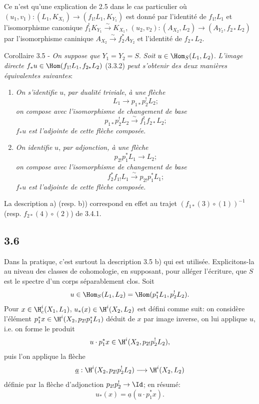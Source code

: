 Ce n'est qu'une explication de 2.5 dans le cas particulier où $(u_1,v_1):(L_1,K_{X_1})\to(f_{1!}L_1,K_{Y_1})$ est donné par l'identité de $f_{1!}L_1$ et l'isomorphisme canonique $f_1^!K_{Y_1}\xrightarrow{\sim}K_{X_1}$, $(u_2,v_2):(A_{X_2},L_2)\to(A_{Y_2},f_{2*}L_2)$ par l'isomorphisme caninique $A_{X_2}\xrightarrow{\sim}f_2^*A_{Y_2}$ et l'identité de $f_{2*}L_2$.

\begin{statement}{Corollaire 3.5 -}
\emph{On suppose que} $Y_1=Y_2=S$. \emph{Soit} $u\in\Hom_S(L_1,L_2)$. \emph{L'image directe} $f_*u\in\Hom(f_{1!}L_1,f_{2*}L_2)$ (3.3.2) \emph{peut s'obtenir des deux manières équivalentes suivantes}:
\end{statement}
\begin{enumerate}[label=\alph*)]
\item \emph{On s'}\emph{identifie} $u$, \emph{par dualité triviale}, \emph{à une flèche}
\[
L_1\longrightarrow p_{1*}p_2^!L_2;
\]
\emph{on compose avec l'isomorphisme de changement de base}
\[
p_{1*}p_2^!L_2\xrightarrow{\sim}f_1^!f_{2*}L_2;
\]
$f_*u$ \emph{est l'adjointe de cette flèche composée}.
\item \emph{On identifie} $u$, \emph{par adjonction, à une flèche}
\[
p_{2!}p_1^*L_1\longrightarrow L_2;
\]
\emph{on compose avec l'isomorphisme de changement de base}
\[
f_2^*f_{1!}L_1\xrightarrow{\sim}p_{2!}p_1^*L_1;
\]
$f_*u$ \emph{est l'adjointe de cette flèche composée.}
\end{enumerate}
La description a) (resp. b)) correspond en effet au trajet $(f_{1*}(3)\circ(1))^{-1}$ (resp. $f_{2*}(4)\circ(2)$) de 3.4.1.

\subsection*{3.6}
Dans la pratique, c'est surtout la description 3.5 b) qui est utilisée. Explicitons-la au niveau des classes de cohomologie, en supposant, pour alléger l'écriture, que $S$ est le spectre d'un corps séparablement clos. Soit
\[
u\in\Hom_S(L_1,L_2)=\Hom(p_1^*L_1,p_2^!L_2).
\]
Pour $x\in\H_c^i(X_1,L_1)$, $u_*(x)\in\H^i(X_2,L_2)$ est défini comme suit: on considère l'élément $p_1^*x\in\H^i(X_2,p_{2!}p_1^*L_1)$ déduit de $x$ par image inverse, on lui applique $u$, i.e. on forme le produit
\[
u\cdot p_1^*x\in \H^i(X_2,p_{2!}p_2^!L_2),
\]
puis l'on applique la flèche
\[
\underline{a}:\H^i(X_2,p_{2!}p_2^!L_2)\longrightarrow \H^i(X_2,L_2)
\]
définie par la flèche d'adjonction $p_{2!}p_2^!\to\Id$; en résumé:
\begin{equation}
u_*(x)=\underline{a}(u\cdot p_1^*x).
\tag{3.6.1}
\end{equation}

